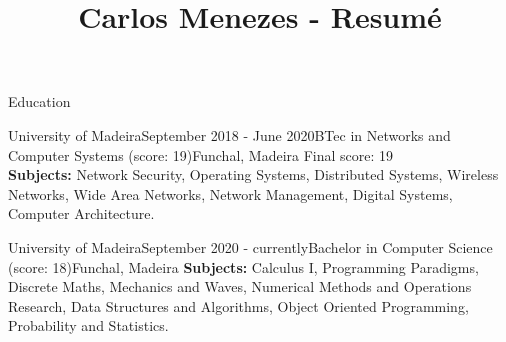 \documentclass{resume} %
\begin{document}
\title{Carlos Menezes - Resumé}

\begin{rSection}{Education}

\begin{rSubsection}{University of Madeira}{September 2018 - June 2020}{BTec in Networks and Computer Systems (score: 19)}{Funchal, Madeira}
\vspace{-.15cm}
Final score: 19 \\
\textbf{Subjects:} Network Security, Operating Systems, Distributed Systems, Wireless Networks, Wide Area Networks, Network Management, Digital Systems, Computer Architecture.
\item[]
\end{rSubsection}

\vspace{-.2cm}

\begin{rSubsection}{University of Madeira}{September 2020 - currently}{Bachelor in Computer Science (score: 18)}{Funchal, Madeira}
\vspace{-.15cm}
\textbf{Subjects:} Calculus I, Programming Paradigms, Discrete Maths, Mechanics and Waves, Numerical Methods and Operations Research, Data Structures and Algorithms, Object Oriented Programming, Probability and Statistics.
\item[]
\end{rSubsection}

\end{rSection}

\end{document}

